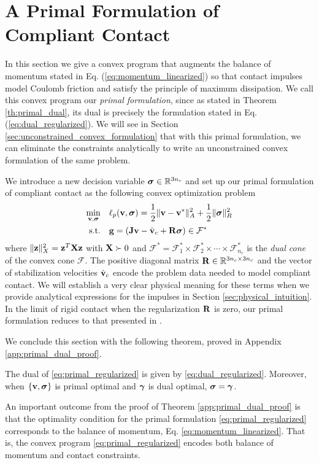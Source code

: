 \section{A Primal Formulation of Compliant Contact}
\label{sec:primal_formulation}

In this section we give a convex program that augments the balance of momentum
stated in Eq. (\ref{eq:momentum_linearized}) so that contact impulses model
Coulomb friction and satisfy the principle of maximum dissipation.
We call this convex program our \emph{primal formulation}, since as stated in Theorem \ref{th:primal_dual},
its dual is precisely the formulation stated in Eq.
(\ref{eq:dual_regularized}). We will see in Section
\ref{sec:unconstrained_convex_formulation} that with this primal formulation,
we can eliminate the constraints analytically to write an unconstrained convex
formulation of the same problem.

We introduce a new decision variable ${\bm{\sigma}}\in\mathbb{R}^{3n_c}$ and
set up our primal formulation of compliant contact as the following convex
optimization problem
\begin{equation}
	\begin{aligned}
	\min_{\mf{v},\bsigma} \quad & \ell_p(\mf{v},\bsigma) =
	\frac{1}{2}\Vert\mf{v}-\mf{v}^*\Vert_{A}^2 +
	\frac{1}{2} \Vert\bsigma\Vert_{R}^2\\
	\textrm{s.t.} \quad & \mf{g} = (\mf{J}\mf{v}-\hat{\mf{v}}_c + \mf{R}\bsigma) \in \mathcal{F}^*\\
	\end{aligned}
	\label{eq:primal_regularized}
\end{equation}
where $\Vert{\mathbf{z}}\Vert_X^2={\mathbf{z}}^T{\mathbf{X}}{\mathbf{z}}$ with ${\mathbf{X}}\succ 0$ and
$\mathcal{F^*}= \mathcal{F}^*_1 \times \mathcal{F}^*_2 \times \cdots \times
\mathcal{F}^*_{n_c}$ is the \emph{dual cone} of the convex cone $\mathcal{F}$.
The positive diagonal matrix ${\mathbf{R}}\in\mathbb{R}^{3n_c\times 3n_c}$ and the
vector of stabilization velocities $\hat{{\mathbf{v}}}_c$ encode the problem data
needed to model compliant contact. We will establish a very clear physical
meaning for these terms when we provide analytical expressions for the impulses
in Section \ref{sec:physical_intuition}. In the limit of rigid contact
when the regularization ${\mathbf{R}}$ is zero, our primal formulation reduces to that
presented in \cite{bib:mazhar2014}.

We conclude this section with the following theorem, proved in Appendix \ref{app:primal_dual_proof}.

\begin{theorem}\label{th:primal_dual}
The dual of \eqref{eq:primal_regularized} is given by 
\eqref{eq:dual_regularized}. Moreover, when $\{{\mathbf{v}},{\bm\sigma}\}$ is primal optimal and
${\bm\gamma}$ is dual optimal, ${\bm\sigma} = {\bm\gamma}$.
\end{theorem}

An important outcome from the proof of Theorem \ref{app:primal_dual_proof} is
that the optimality condition for the primal formulation
\eqref{eq:primal_regularized} corresponds to the balance of momentum, Eq.
\eqref{eq:momentum_linearized}. That is, the convex program
\eqref{eq:primal_regularized} encodes both balance of momentum and contact
constraints.